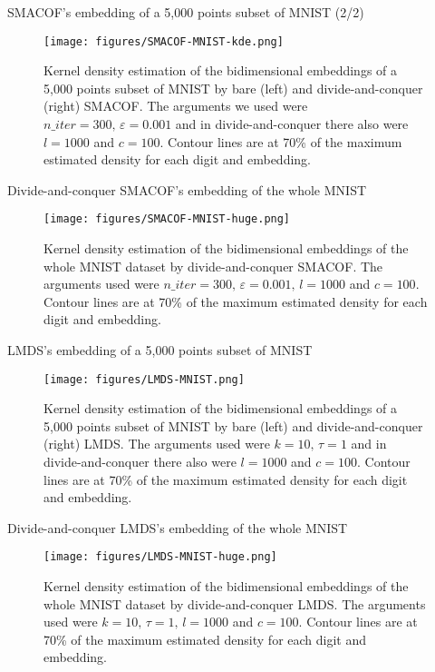 \documentclass[10pt]{beamer}
\begin{document}
\begin{frame}{SMACOF's embedding of a 5,000 points subset of MNIST (2/2)}
    \begin{figure}
        \centering
        \texttt{[image: figures/SMACOF-MNIST-kde.png]}
    \caption{Kernel density estimation of the bidimensional embeddings of a 5,000 points subset of MNIST by bare (left) and divide-and-conquer (right) SMACOF. The arguments we used were $n\_iter = 300,\, \varepsilon = 0.001$ and in divide-and-conquer there also were $l=1000$ and $c=100$. Contour lines are at 70\% of the maximum estimated density for each digit and embedding.}
        \label{fig:SMACOF-MNIST-kde}
    \end{figure}
\end{frame}
\begin{frame}{Divide-and-conquer SMACOF's embedding of the whole MNIST}
    \begin{figure}
        \centering
        \texttt{[image: figures/SMACOF-MNIST-huge.png]}
    \caption{Kernel density estimation of the bidimensional embeddings of the whole MNIST dataset by divide-and-conquer SMACOF. The arguments used were $n\_iter = 300,\, \varepsilon = 0.001, \, l=1000$ and $c=100$. Contour lines are at 70\% of the maximum estimated density for each digit and embedding.}
        \label{fig:SMACOF-MNIST-huge}
    \end{figure}
\end{frame}

\begin{frame}{LMDS's embedding of a 5,000 points subset of MNIST}
    \begin{figure}
        \centering
        \texttt{[image: figures/LMDS-MNIST.png]}
    \caption{Kernel density estimation of the bidimensional embeddings of a 5,000 points subset of MNIST by bare (left) and divide-and-conquer (right) LMDS. The arguments used were $k=10,\, \tau = 1$ and in divide-and-conquer there also were $l=1000$ and $c=100$. Contour lines are at 70\% of the maximum estimated density for each digit and embedding.}
        \label{fig:LMDS-MNIST-kde}
    \end{figure}
\end{frame}
\begin{frame}{Divide-and-conquer LMDS's embedding of the whole MNIST}
    \begin{figure}
        \centering
        \texttt{[image: figures/LMDS-MNIST-huge.png]}
    \caption{Kernel density estimation of the bidimensional embeddings of the whole MNIST dataset by divide-and-conquer LMDS. The arguments used were $k=10,\, \tau = 1, \, l=1000$ and $c=100$. Contour lines are at 70\% of the maximum estimated density for each digit and embedding.}
        \label{fig:LMDS-MNIST-huge}
    \end{figure}
\end{frame}
\end{document}
